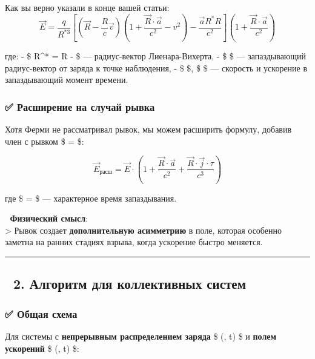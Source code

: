 \documentclass[11pt]{article}
\begin{document}
Как вы верно указали в конце вашей статьи: \[
\boxed{
\vec{E} = \frac{q}{R^{*3}} \left[ (\vec{R} - \frac{R}{c}\vec{v}) \left(1 + \frac{\vec{R} \cdot \vec{a}}{c^2} - v^2 \right) - \frac{\vec{a} R^* R}{c^2} \right] \left(1 + \frac{\vec{R} \cdot \vec{a}}{c^2}\right)
}
\]

где: - \$ R\^{}* = R -  \$ ---
радиус-вектор Лиенара-Вихерта, - \$  \$ --- запаздывающий
радиус-вектор от заряда к точке наблюдения, - \$  \$, \$ 
\$ --- скорость и ускорение в запаздывающий момент времени.

\subsubsection{✅ Расширение на случай
рывка}\label{ux440ux430ux441ux448ux438ux440ux435ux43dux438ux435-ux43dux430-ux441ux43bux443ux447ux430ux439-ux440ux44bux432ux43aux430}

Хотя Ферми не рассматривал рывок, мы можем расширить формулу, добавив
член с рывком \$  =  \$:

\[
\boxed{
\vec{E}_{\text{расш}} = \vec{E} \cdot \left(1 + \frac{\vec{R} \cdot \vec{a}}{c^2} + \frac{\vec{R} \cdot \vec{j} \cdot \tau}{c^3} \right)
}
\]

где \$ \tau =  \$ --- характерное время запаздывания.

📌 \textbf{Физический смысл}:\\
\textgreater{} Рывок создает \textbf{дополнительную асимметрию} в поле,
которая особенно заметна на ранних стадиях взрыва, когда ускорение
быстро меняется.

\begin{center}\rule{0.5\linewidth}{\linethickness}\end{center}

\subsection{🔹 2. Алгоритм для коллективных
систем}\label{ux430ux43bux433ux43eux440ux438ux442ux43c-ux434ux43bux44f-ux43aux43eux43bux43bux435ux43aux442ux438ux432ux43dux44bux445-ux441ux438ux441ux442ux435ux43c}

\subsubsection{✅ Общая
схема}\label{ux43eux431ux449ux430ux44f-ux441ux445ux435ux43cux430}

Для системы с \textbf{непрерывным распределением заряда} \$
\rho(, t) \$ и \textbf{полем ускорений} \$ \vec{\Gamma}(,
t) \$:
\end{document}
